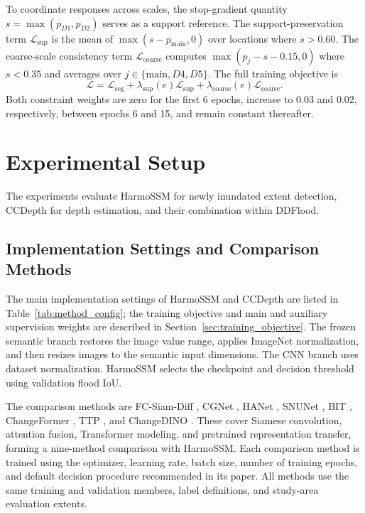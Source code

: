 \documentclass[authoryear,preprint,12pt]{elsarticle}
\begin{document}
To coordinate responses across scales, the stop-gradient quantity \(s=\max(p_{D1},p_{D2})\) serves as a support reference. The support-preservation term \(\mathcal L_{\mathrm{sup}}\) is the mean of \(\max(s-p_{\mathrm{main}},0)\) over locations where \(s>0.60\). The coarse-scale consistency term \(\mathcal L_{\mathrm{coarse}}\) computes \(\max(p_j-s-0.15,0)\) where \(s<0.35\) and averages over \(j\in\{\mathrm{main},D4,D5\}\). The full training objective is
\begin{equation}\label{eq:total_loss}
  \mathcal{L}
  =
  \mathcal{L}_{\mathrm{seg}}
  +
  \lambda_{\mathrm{sup}}(e)\mathcal{L}_{\mathrm{sup}}
  +
  \lambda_{\mathrm{coarse}}(e)\mathcal{L}_{\mathrm{coarse}}.
\end{equation}
Both constraint weights are zero for the first 6 epochs, increase to 0.03 and 0.02, respectively, between epochs 6 and 15, and remain constant thereafter.

\endgroup

\section{Experimental Setup}\label{sec:eval_protocol}

The experiments evaluate HarmoSSM for newly inundated extent detection, CCDepth for depth estimation, and their combination within DDFlood.

\begingroup
\subsection{Implementation Settings and Comparison Methods}\label{sec:experiment_implementation}

The main implementation settings of HarmoSSM and CCDepth are listed in Table~\ref{tab:method_config}; the training objective and main and auxiliary supervision weights are described in Section~\ref{sec:training_objective}. The frozen semantic branch restores the image value range, applies ImageNet normalization, and then resizes images to the semantic input dimensions. The CNN branch uses dataset normalization. HarmoSSM selects the checkpoint and decision threshold using validation flood IoU.



The comparison methods are FC-Siam-Diff \citep{daudt2018fully}, CGNet \citep{han2023change}, HANet \citep{han2023hanet}, SNUNet \citep{fang2022snunet}, BIT \citep{chen2021remote}, ChangeFormer \citep{bandara2022changeformer}, TTP \citep{chen2023ttp}, and ChangeDINO \citep{cheng2025changedino}. These cover Siamese convolution, attention fusion, Transformer modeling, and pretrained representation transfer, forming a nine-method comparison with HarmoSSM. Each comparison method is trained using the optimizer, learning rate, batch size, number of training epochs, and default decision procedure recommended in its paper. All methods use the same training and validation members, label definitions, and study-area evaluation extents.
\end{document}
